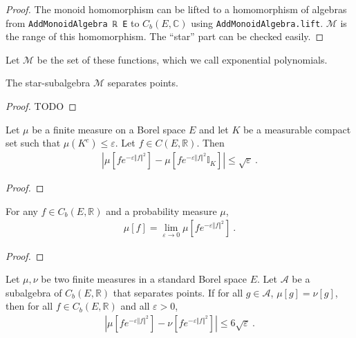 \begin{proof} \leanok
The monoid homomorphism can be lifted to a homomorphism of algebras from \texttt{AddMonoidAlgebra ℝ E} to $C_b(E, \mathbb{C})$ using \texttt{AddMonoidAlgebra.lift}. $\mathcal M$ is the range of this homomorphism. The ``star'' part can be checked easily.
\end{proof}


Let $\mathcal M$ be the set of these functions, which we call exponential polynomials.

\begin{lemma}\label{lem:separates_points_expPoly}
 \leanok
{}
The star-subalgebra $\mathcal M$ separates points.
\end{lemma}

\begin{proof}
TODO
\end{proof}


\begin{lemma}\label{lem:integral_restrict_compact}
\mathlibok
{}
Let $\mu$ be a finite measure on a Borel space $E$ and let $K$ be a measurable compact set such that $\mu(K^c) \le \varepsilon$. Let $f \in C(E, \mathbb{R})$. Then
\begin{align*}
\left\vert \mu[fe^{-\varepsilon \Vert f \Vert^2}] - \mu[f e^{-\varepsilon \Vert f \Vert^2} \mathbb{I}_K] \right\vert
\le \sqrt{\varepsilon} \: .
\end{align*}
\end{lemma}

\begin{proof}\leanok
\end{proof}


\begin{lemma}\label{lem:introduce_exponential}
\mathlibok
{}
For any $f \in C_b(E, \mathbb{R})$ and a probability measure $\mu$,
\begin{align*}
\mu[f] 
= \lim_{\varepsilon \to 0} \mu\left[f e^{-\varepsilon \Vert f \Vert^2} \right]
\: .
\end{align*}
\end{lemma}

\begin{proof}\leanok
\end{proof}


\begin{lemma}\label{lem:dist_integral_mulExpNegMulSq_comp_le}
\mathlibok
{}
Let $\mu, \nu$ be two finite measures in a standard Borel space $E$. Let $\mathcal{A}$ be a subalgebra of $C_b(E, \mathbb{R})$ that separates points.
If for all $g \in \mathcal A$, $\mu[g] = \nu[g]$, then for all $f \in C_b(E, \mathbb{R})$ and all $\varepsilon > 0$,
\begin{align*}
    \left\vert \mu[fe^{-\varepsilon \Vert f \Vert^2}] - \nu[f e^{-\varepsilon \Vert f \Vert^2}] \right\vert
    \le 6\sqrt{\varepsilon} \: .
\end{align*}
\end{lemma}

